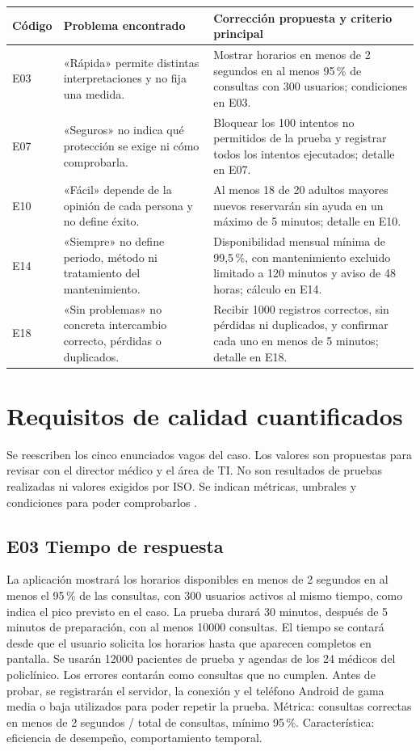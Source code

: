 \documentclass[11pt,a4paper]{article}
\begin{document}
\begin{longtable}{|L{1.5cm}|L{4.6cm}|L{6.8cm}|}
\hline
\textbf{Código} & \textbf{Problema encontrado} & \textbf{Corrección propuesta y criterio principal} \\\hline
E03 & «Rápida» permite distintas interpretaciones y no fija una medida. & Mostrar horarios en menos de 2 segundos en al menos 95\,\% de consultas con 300 usuarios; condiciones en E03. \\\hline
E07 & «Seguros» no indica qué protección se exige ni cómo comprobarla. & Bloquear los 100 intentos no permitidos de la prueba y registrar todos los intentos ejecutados; detalle en E07. \\\hline
E10 & «Fácil» depende de la opinión de cada persona y no define éxito. & Al menos 18 de 20 adultos mayores nuevos reservarán sin ayuda en un máximo de 5 minutos; detalle en E10. \\\hline
E14 & «Siempre» no define periodo, método ni tratamiento del mantenimiento. & Disponibilidad mensual mínima de 99,5\,\%, con mantenimiento excluido limitado a 120 minutos y aviso de 48 horas; cálculo en E14. \\\hline
E18 & «Sin problemas» no concreta intercambio correcto, pérdidas o duplicados. & Recibir 1000 registros correctos, sin pérdidas ni duplicados, y confirmar cada uno en menos de 5 minutos; detalle en E18. \\\hline
\end{longtable}

\section{Requisitos de calidad cuantificados}

Se reescriben los cinco enunciados vagos del caso. Los valores son propuestas para revisar con el director médico y el área de TI. No son resultados de pruebas realizadas ni valores exigidos por ISO. Se indican métricas, umbrales y condiciones para poder comprobarlos \cite{iso29148}.

\subsection{E03 Tiempo de respuesta}
La aplicación mostrará los horarios disponibles en menos de 2 segundos en al menos el 95\,\% de las consultas, con 300 usuarios activos al mismo tiempo, como indica el pico previsto en el caso. La prueba durará 30 minutos, después de 5 minutos de preparación, con al menos 10000 consultas. El tiempo se contará desde que el usuario solicita los horarios hasta que aparecen completos en pantalla. Se usarán 12000 pacientes de prueba y agendas de los 24 médicos del policlínico. Los errores contarán como consultas que no cumplen. Antes de probar, se registrarán el servidor, la conexión y el teléfono Android de gama media o baja utilizados para poder repetir la prueba. Métrica: consultas correctas en menos de 2 segundos / total de consultas, mínimo 95\,\%. Característica: eficiencia de desempeño, comportamiento temporal.
\end{document}
